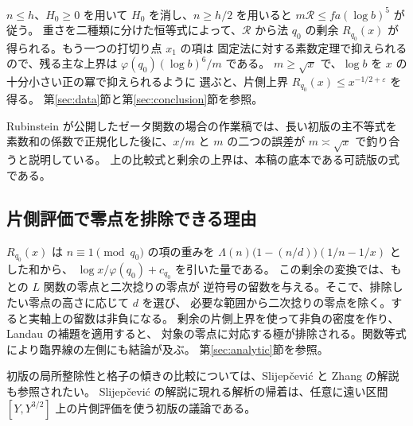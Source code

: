 \(n\le h\)、\(H_0\ge0\) を用いて \(H_0\) を消し、\(n\ge h/2\) を用いると
\(m\mathcal R\le fa(\log b)^5\) が従う。
重さを二種類に分けた恒等式によって、\(\mathcal R\) から法 \(q_0\) の剰余
\(R_{q_0}(x)\) が得られる。もう一つの打切り点 \(x_1\) の項は
固定法に対する素数定理で抑えられるので、残る主な上界は
\(\varphi(q_0)(\log b)^6/m\) である。
\(m\ge\sqrt{x}\) で、\(\log b\) を \(x\) の十分小さい正の冪で抑えられるように
選ぶと、片側上界 \(R_{q_0}(x)\le x^{-1/2+\varepsilon}\) を得る。
第\ref{sec:data}節と第\ref{sec:conclusion}節を参照。

\begin{editorialnote}
Rubinstein が公開したゼータ関数の場合の作業稿では、長い初版の主不等式を
素数和の係数で正規化した後に、\(x/m\) と \(m\) の二つの誤差が
\(m\asymp\sqrt{x}\) で釣り合うと説明している。
上の比較式と剰余の上界は、本稿の底本である可読版の式である。
\cite[第I.8節]{rubinstein}
\end{editorialnote}

\subsection*{片側評価で零点を排除できる理由}

\(R_{q_0}(x)\) は \(n\equiv1\pmod{q_0}\) の項の重みを
\(\Lambda(n)\bigl(1-(n/d)\bigr)(1/n-1/x)\) とした和から、
\(\log x/\varphi(q_0)+c_{q_0}\) を引いた量である。
この剰余の変換では、もとの \(L\) 関数の零点と二次捻りの零点が
逆符号の留数を与える。そこで、排除したい零点の高さに応じて \(d\) を選び、
必要な範囲から二次捻りの零点を除く。すると実軸上の留数は非負になる。
剰余の片側上界を使って非負の密度を作り、Landau の補題を適用すると、
対象の零点に対応する極が排除される。関数等式により臨界線の左側にも結論が及ぶ。
第\ref{sec:analytic}節を参照。

初版の局所整除性と格子の傾きの比較については、Slijepčević と Zhang の解説も参照されたい。
Slijepčević の解説に現れる解析の帰着は、任意に遠い区間
\([Y,Y^{3/2}]\) 上の片側評価を使う初版の議論である。
\cite[第1.3節]{slijepcevic} \cite[第1節・第4節]{zhang}
